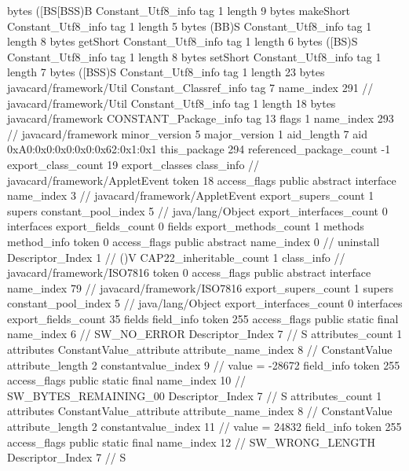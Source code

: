 {{{			bytes	([BS[BSS)B
		}
		Constant_Utf8_info {
			tag	1
			length	9
			bytes	makeShort
		}
		Constant_Utf8_info {
			tag	1
			length	5
			bytes	(BB)S
		}
		Constant_Utf8_info {
			tag	1
			length	8
			bytes	getShort
		}
		Constant_Utf8_info {
			tag	1
			length	6
			bytes	([BS)S
		}
		Constant_Utf8_info {
			tag	1
			length	8
			bytes	setShort
		}
		Constant_Utf8_info {
			tag	1
			length	7
			bytes	([BSS)S
		}
		Constant_Utf8_info {
			tag	1
			length	23
			bytes	javacard/framework/Util
		}
		Constant_Classref_info {
			tag	7
			name_index	291		// javacard/framework/Util
		}
		Constant_Utf8_info {
			tag	1
			length	18
			bytes	javacard/framework
		}
		CONSTANT_Package_info {
			tag	13
			flags	1
			name_index	293		// javacard/framework
			minor_version	5
			major_version	1
			aid_length	7
			aid	0xA0:0x0:0x0:0x0:0x62:0x1:0x1
		}
	}
	this_package	294
	referenced_package_count	-1
	export_class_count	19
	export_classes {
		class_info {		// javacard/framework/AppletEvent
			token	18
			access_flags	public abstract interface
			name_index	3		// javacard/framework/AppletEvent
			export_supers_count	1
			supers {
				constant_pool_index	5		// java/lang/Object
			}
			export_interfaces_count	0
			interfaces {
			}
			export_fields_count	0
			fields {
			}
			export_methods_count	1
			methods {
				method_info {
					token	0
					access_flags	public abstract
					name_index	0		// uninstall
					Descriptor_Index	1		// ()V
				}
			}
			CAP22_inheritable_count	1
		}
		class_info {		// javacard/framework/ISO7816
			token	0
			access_flags	public abstract interface
			name_index	79		// javacard/framework/ISO7816
			export_supers_count	1
			supers {
				constant_pool_index	5		// java/lang/Object
			}
			export_interfaces_count	0
			interfaces {
			}
			export_fields_count	35
			fields {
			field_info {
				token	255
				access_flags	public static final
				name_index	6		// SW_NO_ERROR
				Descriptor_Index	7		// S
				attributes_count	1
				attributes {
				ConstantValue_attribute {
					attribute_name_index	8		// ConstantValue
					attribute_length	2
					constantvalue_index	9		// value = -28672
				}
				}
			}
			field_info {
				token	255
				access_flags	public static final
				name_index	10		// SW_BYTES_REMAINING_00
				Descriptor_Index	7		// S
				attributes_count	1
				attributes {
				ConstantValue_attribute {
					attribute_name_index	8		// ConstantValue
					attribute_length	2
					constantvalue_index	11		// value = 24832
				}
				}
			}
			field_info {
				token	255
				access_flags	public static final
				name_index	12		// SW_WRONG_LENGTH
				Descriptor_Index	7		// S
}}}}}
